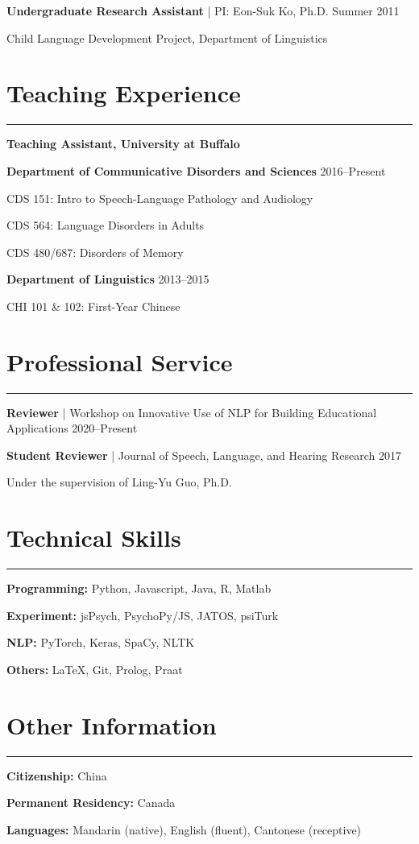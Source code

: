 \documentclass[11pt]{article}
\newcommand{\cvsection}[1]{\vspace{-0.2cm}\section*{\Large #1}\vspace{-0.2cm}\hrule\vspace{0.2cm}}
\begin{document}
\textbf{Undergraduate Research Assistant} | PI: Eon-Suk Ko, Ph.D. \hfill Summer 2011

\quad Child Language Development Project, Department of Linguistics


\cvsection{Teaching Experience}

\textbf{Teaching Assistant, University at Buffalo}

\textbf{Department of Communicative Disorders and Sciences} \hfill 2016--Present

\quad CDS 151: Intro to Speech-Language Pathology and Audiology

\quad CDS 564: Language Disorders in Adults

\quad CDS 480/687: Disorders of Memory

\textbf{Department of Linguistics} \hfill 2013--2015

\quad CHI 101 \& 102: First-Year Chinese


\cvsection{Professional Service}

\textbf{Reviewer} | Workshop on Innovative Use of NLP for Building Educational Applications \hfill 2020--Present

\textbf{Student Reviewer} | Journal of Speech, Language, and Hearing Research \hfill 2017

\quad Under the supervision of Ling-Yu Guo, Ph.D.

\cvsection{Technical Skills}

\textbf{Programming:} Python, Javascript, Java, R, Matlab

\textbf{Experiment:} jsPsych, PsychoPy/JS, JATOS, psiTurk

\textbf{NLP:} PyTorch, Keras, SpaCy, NLTK

\textbf{Others:} \LaTeX, Git, Prolog, Praat


\cvsection{Other Information}

\textbf{Citizenship:} China

\textbf{Permanent Residency:} Canada

\textbf{Languages:} Mandarin (native), English (fluent), Cantonese (receptive)
\end{document}
